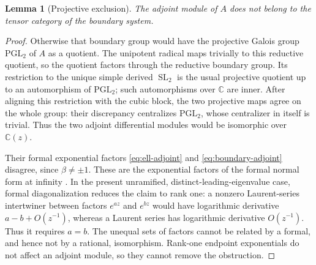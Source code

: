 \documentclass[11pt]{article}
\numberwithin{equation}{section}
\newtheorem{lemma}[lemma]{Lemma}
\theoremstyle{definition}
\theoremstyle{remark}
\newcommand{\C}{\mathbb C}
\newcommand{\SL}{\operatorname{SL}}
\begin{document}
\begin{lemma}[Projective exclusion]\label{lem:projective-exclusion}
The adjoint module of $A$ does not belong to the tensor category of the
boundary system.
\end{lemma}
\begin{proof}
Otherwise that boundary group would have the projective Galois group
$\mathrm{PGL}_2$ of $A$ as a quotient. The unipotent radical maps trivially
to this reductive quotient, so the quotient factors through the reductive
boundary group. Its restriction to the unique simple derived $\SL_2$
is the usual projective quotient up to an automorphism of
$\mathrm{PGL}_2$; such automorphisms over $\C$ are inner. After aligning
this restriction with the cubic block, the two projective maps agree on the
whole group: their discrepancy centralizes $\mathrm{PGL}_2$, whose
centralizer in itself is trivial. Thus the two adjoint differential modules
would be isomorphic over $\C(z)$.

Their formal exponential factors \eqref{eq:ell-adjoint} and
\eqref{eq:boundary-adjoint} disagree, since $\beta\ne\pm1$. These are the exponential factors of the formal normal form at infinity
\cite[\S1.4, formal fundamental matrix]{Singer}. In the present
unramified, distinct-leading-eigenvalue case, formal diagonalization
reduces the claim to rank one: a nonzero Laurent-series intertwiner
between factors $e^{az}$ and $e^{bz}$ would have logarithmic derivative
$a-b+O(z^{-1})$, whereas a Laurent series has logarithmic derivative
$O(z^{-1})$. Thus it requires $a=b$. The unequal sets of factors cannot
be related by a formal, and hence not by a rational, isomorphism.
Rank-one endpoint exponentials do not affect an adjoint module, so they
cannot remove the obstruction.
\end{proof}
\end{document}
